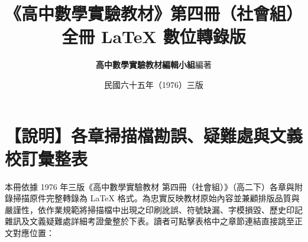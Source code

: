 \documentclass[a4paper,12pt,twoside]{article}
\title{\LARGE\textbf{《高中數學實驗教材》第四冊（社會組）}\\[0.5em] \Large\textbf{全冊 \LaTeX{} 數位轉錄版}}
\author{\textbf{高中數學實驗教材編輯小組}\quad 編著}
\date{民國六十五年（1976）三版}
\begin{document}
\maketitle
\thispagestyle{empty}

\section*{【說明】各章掃描檔勘誤、疑難處與文義校訂彙整表}
\label{sec:master_errata_notes_b4s}
\label{sec:current_errata}

本冊依據 1976 年三版《高中數學實驗教材 第四冊（社會組）》（高二下）各章與附錄掃描原件完整轉錄為 \LaTeX{} 格式。為忠實反映教材原始內容並兼顧排版品質與嚴謹性，依作業規範將掃描檔中出現之印刷訛誤、符號缺漏、字模損毀、歷史印記雜訊及文義疑難處詳細考證彙整於下表。讀者可點擊表格中之章節連結直接跳至正文對應位置：
\end{document}
